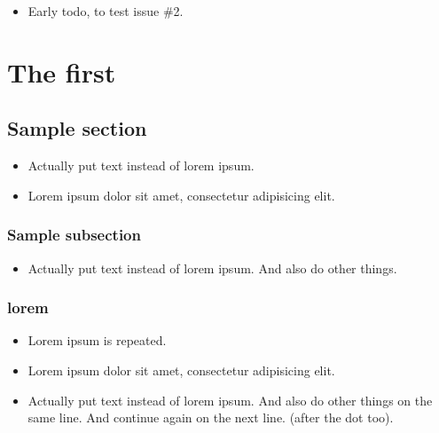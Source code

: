     \begin{itemize}[noitemsep]
        \item {\color{red}Early todo, to test issue \#2.}
    \end{itemize}
\chapter{The first}
\label{autosec:0}
\vspace{-36pt}\hspace{11pt}
\section{Sample section}
\label{autosec:1}
    \begin{itemize}[noitemsep]
        \item {\color{red}Actually put text instead of lorem ipsum.}
        \item Lorem ipsum dolor sit amet, consectetur adipisicing elit.
    \end{itemize}
\subsection{Sample subsection}
\label{autosec:2}
    \begin{itemize}[noitemsep]
        \item {\color{red}Actually put text instead of lorem ipsum.}
{\color{red}And also do other things.}
    \end{itemize}
\subsection{lorem}
\label{autosec:3}
    \begin{itemize}[noitemsep]
        \item {\color{DarkOrchid}Lorem ipsum is repeated.}
        \item Lorem ipsum dolor sit amet, consectetur adipisicing elit.
        \item {\color{red}Actually put text instead of lorem ipsum. And also do other things on the same line.}
{\color{red}And continue again on the next line. (after the dot too).}
    \end{itemize}
